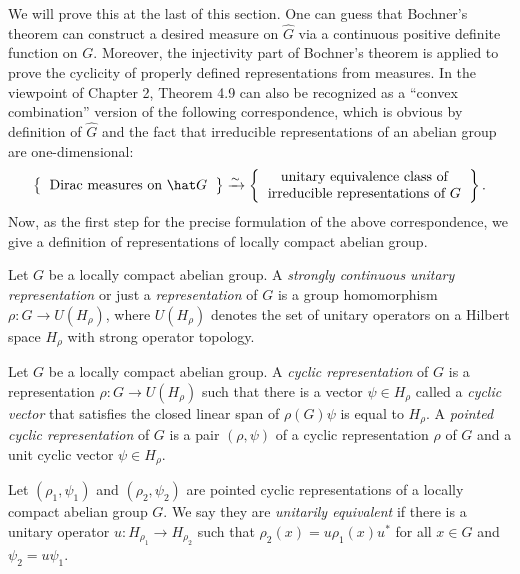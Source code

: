 \documentclass[a4paper]{article}
\begin{document}
We will prove this at the last of this section.
One can guess that Bochner's theorem can construct a desired measure on $\hat G$ via a continuous positive definite function on $G$.
Moreover, the injectivity part of Bochner's theorem is applied to prove the cyclicity of properly defined representations from measures.
In the viewpoint of Chapter 2, Theorem 4.9 can also be recognized as a ``convex combination'' version of the following correspondence, which is obvious by definition of $\hat G$ and the fact that irreducible representations of an abelian group are one-dimensional:
\[\left\{\begin{tabular}{c}Dirac measures on $\hat G$\end{tabular}\right\}\xrightarrow{\sim}\left\{\begin{tabular}{c}unitary equivalence class of\\irreducible representations of $G$\end{tabular}\right\}.\]
Now, as the first step for the precise formulation of the above correspondence, we give a definition of representations of locally compact abelian group.

\begin{defn}
Let $G$ be a locally compact abelian group.
A \emph{strongly continuous unitary representation} or just a \emph{representation} of $G$ is a group homomorphism $\rho:G\to U(H_\rho)$, where $U(H_\rho)$ denotes the set of unitary operators on a Hilbert space $H_\rho$ with strong operator topology.
\end{defn}

\begin{defn}
Let $G$ be a locally compact abelian group.
A \emph{cyclic representation} of $G$ is a representation $\rho:G\to U(H_\rho)$ such that there is a vector $\psi\in H_\rho$ called a \emph{cyclic vector} that satisfies the closed linear span of $\rho(G)\psi$ is equal to $H_\rho$.
A \emph{pointed cyclic representation} of $G$ is a pair $(\rho,\psi)$ of a cyclic representation $\rho$ of $G$ and a unit cyclic vector $\psi\in H_\rho$.
\end{defn}

\begin{defn}
Let $(\rho_1,\psi_1)$ and $(\rho_2,\psi_2)$ are pointed cyclic representations of a locally compact abelian group $G$.
We say they are \emph{unitarily equivalent} if there is a unitary operator $u:H_{\rho_1}\to H_{\rho_2}$ such that $\rho_2(x)=u\rho_1(x)u^*$ for all $x\in G$ and $\psi_2=u\psi_1$.
\end{defn}
\end{document}
